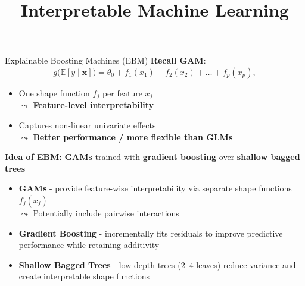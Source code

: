 \documentclass[11pt,compress,t,notes=noshow, aspectratio=169, xcolor=table]{beamer}
\title{Interpretable Machine Learning}
\date{}
\begin{document}
\newcommand{\titlefigure}{figure/ebm.jpg}
\newcommand{\learninggoals}{
\item Motivation from GAM
\item Intelligible GAM
\item Accurate GAM + Pairwise Interactions
\item FAST feature interaction detection}


\begin{frame}{Explainable Boosting Machines (EBM) }
\textbf{Recall GAM}: 
$$
g\big(\mathbb{E}[y \mid \mathbf{x}]\big) = \theta_0 + f_1(x_{1}) + f_2(x_{2}) + \ldots + f_p(x_{p}),
$$

\begin{itemize}
    \item One shape function $f_j$ per feature $x_j$\\ $\leadsto$ \textbf{Feature-level interpretability}
    \item Captures non-linear univariate effects\\ $\leadsto$ \textbf{Better performance / more flexible than GLMs}
\end{itemize}

\medskip

\textbf{Idea of EBM:} \textbf{GAMs} trained with \textbf{gradient boosting} over \textbf{shallow bagged trees}
\begin{itemize}
    \item \textbf{GAMs} - provide feature-wise interpretability via separate shape functions $f_j(x_j)$\\
    $\leadsto$ Potentially include pairwise interactions
    \item \textbf{Gradient Boosting} - incrementally fits residuals to improve predictive performance while retaining additivity
    \item \textbf{Shallow Bagged Trees} - low-depth trees (2–4 leaves) reduce variance and create interpretable shape functions
\end{itemize}



\end{frame}
\end{document}
